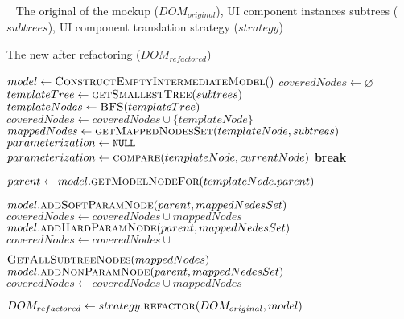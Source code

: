 
\begin{algorithmic}[1]

\renewcommand{\algorithmicrequire}{\textbf{Input:}}
\renewcommand{\algorithmicensure}{\textbf{Output:}}

\Require \par ~ The original \dom of the mockup ($DOM_{original}$),
UI component instances \dom subtrees ($subtrees$), 
UI component translation strategy ($strategy$)

\Ensure The new \dom after refactoring ($DOM_{refactored}$)


\State $model \gets \Call{ConstructEmptyIntermediateModel}{{}}$ \label{algoline:ui-component-empty-model}
\State $coveredNodes \gets \varnothing$ \label{algoline:ui-component-covered-nodes-init}
\State $templateTree \gets \Call{getSmallestTree}{subtrees}$ \label{algoline:ui-component-template-tree}
\State $templateNodes \gets \Call{BFS}{templateTree}$
 \label{algoline:ui-component-main-loop-start}
	\State $coveredNodes \gets coveredNodes \cup \{ templateNode \}$
	\State $mappedNodes \gets \Call{getMappedNodesSet}{templateNode, subtrees}$\label{algoline:ui-component-mapped-nodes-set}
	\State $parameterization \gets \code{NULL}$
		\State $parameterization \gets \Call{compare}{templateNode,currentNode}$\label{algoline:ui-component-compare}
			\State \textbf{break} \label{algoline:ui-component-break}
		\EndIf
	\EndFor
	
	\State $parent \gets model.\Call{getModelNodeFor}{templateNode.parent}$\label{algoline:ui-component-add-model-nodes-start}
	
			\State $model.\Call{addSoftParamNode}{parent, mappedNedesSet}$
			\State $coveredNodes \gets coveredNodes \cup mappedNodes$
		\Else
			\State $model.\Call{addHardParamNode}{parent, mappedNedesSet}$
			\State $coveredNodes \gets coveredNodes \cup $ \par 
				\hspace{20mm} $\Call{GetAllSubtreeNodes}{mappedNodes}$
		\EndIf
	\Else
		\State $model.\Call{addNonParamNode}{parent, mappedNedesSet}$
		\State $coveredNodes \gets coveredNodes \cup mappedNodes$
	\EndIf \label{algoline:ui-component-add-model-nodes-end}

\EndFor \label{algoline:ui-component-main-loop-end}
	

\State $DOM_{refactored} \gets strategy.\Call{refactor}{DOM_{original}, model}$ \label{algoline:ui-component-refactor}


\end{algorithmic}